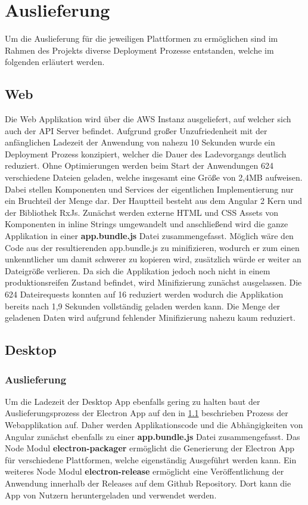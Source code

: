 \newpage
\section{Auslieferung}

Um die Auslieferung für die jeweiligen Plattformen zu ermöglichen
sind im Rahmen des Projekts \projectname{} diverse Deployment Prozesse entstanden,
welche im folgenden erläutert werden.

\subsection{Web}
\label{deployment-web}

Die Web Applikation wird über die \ac{AWS} Instanz ausgeliefert, auf welcher sich auch der \ac{API} Server befindet.
Aufgrund großer Unzufriedenheit mit der anfänglichen Ladezeit der Anwendung von nahezu 10 Sekunden wurde ein Deployment
Prozess konzipiert, welcher die Dauer des Ladevorgangs deutlich reduziert.
Ohne Optimierungen werden beim Start der Anwendungen 624 verschiedene Dateien geladen,
welche insgesamt eine Größe von 2,4MB aufweisen.
Dabei stellen Komponenten und Services der eigentlichen Implementierung nur ein Bruchteil der Menge dar.
Der Hauptteil besteht aus dem Angular 2 Kern und der Bibliothek RxJs.
Zunächst werden externe \ac{HTML} und \ac{CSS} Assets von Komponenten in
inline Strings umgewandelt und anschließend wird die ganze Applikation in einer \textbf{app.bundle.js} Datei zusammengefasst.
Möglich wäre den Code aus der resultierenden app.bundle.js zu minifizieren,
wodurch er zum einen unkenntlicher um damit schwerer zu kopieren wird,
zusätzlich würde er weiter an Dateigröße verlieren. Da sich die Applikation \projectname{}
jedoch noch nicht in einem produktionsreifen Zustand befindet, wird Minifizierung zunächst ausgelassen.
Die 624 Dateirequests konnten auf 16 reduziert werden wodurch die Applikation bereits nach 1,9
Sekunden vollständig geladen werden kann.
Die Menge der geladenen Daten wird aufgrund fehlender Minifizierung nahezu kaum reduziert.

\subsection{Desktop}

\subsubsection{Auslieferung}
Um die Ladezeit der Desktop App ebenfalls gering zu halten baut der Auslieferungsprozess der Electron App
auf den in \ref{deployment-web} beschrieben Prozess der Webapplikation auf. Daher werden Applikationscode und die
Abhängigkeiten von Angular zunächst ebenfalls zu einer \textbf{app.bundle.js} Datei zusammengefasst.
Das Node Modul \textbf{electron-packager} ermöglicht die Generierung der Electron App für verschiedene Plattformen,
welche eigenständig Ausgeführt werden kann.
Ein weiteres Node Modul \textbf{electron-release} ermöglicht eine Veröffentlichung
der Anwendung innerhalb der Releases auf dem Github Repository.
Dort kann die App von Nutzern heruntergeladen und verwendet werden.


